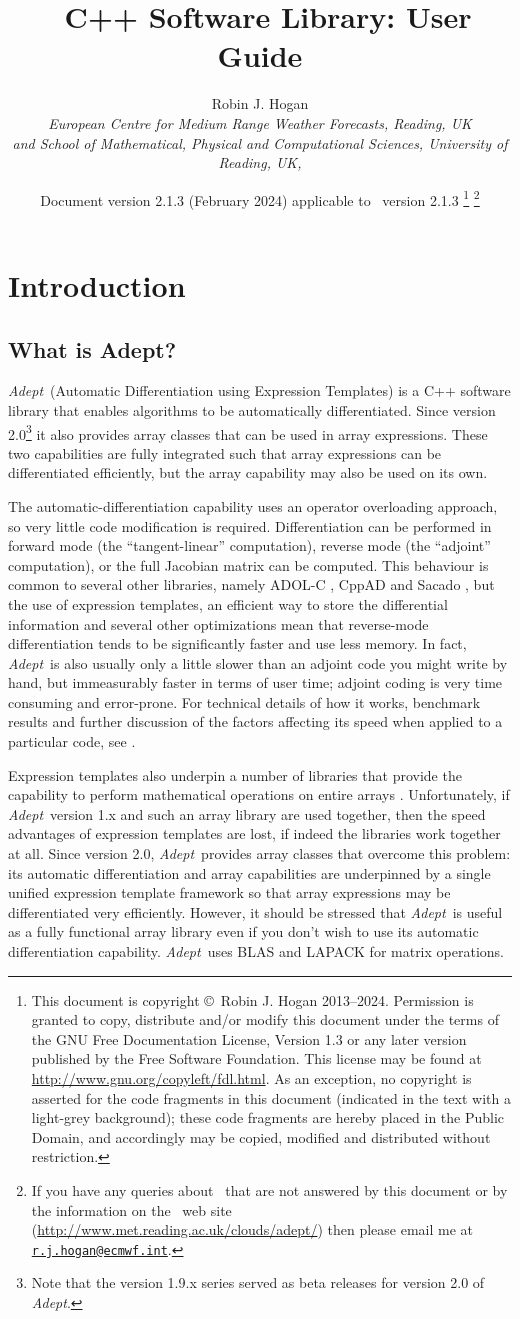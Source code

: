 \documentclass[a4,oneside]{book}
\title{\Adept\ C++ Software Library: User Guide}
\author{Robin J. Hogan\\ \emph{European Centre for Medium Range
    Weather Forecasts, Reading, UK}\\ \emph{and School of
    Mathematical, Physical and Computational Sciences, University of
    Reading, UK,}}
\date{Document version 2.1.3 (February 2024) applicable to \Adept\ version
  2.1.3 \thanks{This document is copyright \copyright\ Robin J. Hogan
    2013--2024.  Permission is granted to copy, distribute and/or
    modify this document under the terms of the GNU Free Documentation
    License, Version 1.3 or any later version published by the Free
    Software Foundation. This license may be found at
    \url{http://www.gnu.org/copyleft/fdl.html}.  As an exception, no
    copyright is asserted for the code fragments in this document
    (indicated in the text with a light-grey background); these code
    fragments are hereby placed in the Public Domain, and accordingly
    may be copied, modified and distributed without restriction.}
  \thanks{If you have any queries about \Adept\ that are not answered
    by this document or by the information on the \Adept\ web site
    (\url{http://www.met.reading.ac.uk/clouds/adept/}) then please
    email me at
    \href{mailto:r.j.hogan@ecmwf.int}{\texttt{r.j.hogan@ecmwf.int}}.}}
\def\Adept{\emph{Adept}}
\renewcommand\thefootnote{\relax}
\begin{document}
\maketitle

\tableofcontents
\def\thefootnote{\fnsymbol{footnote}}
\chapter{Introduction}
\section{What is Adept?}
\Adept\ (Automatic Differentiation using Expression Templates) is a
C++ software library that enables algorithms to be automatically
differentiated. Since version 2.0\footnote{Note that the version 1.9.x
  series served as beta releases for version 2.0 of \Adept.} it also
provides array classes that can be used in array expressions.  These
two capabilities are fully integrated such that array expressions can
be differentiated efficiently, but the array capability may also be
used on its own.

The automatic-differentiation capability uses an operator overloading
approach, so very little code modification is
required. Differentiation can be performed in forward mode (the
``tangent-linear'' computation), reverse mode (the ``adjoint''
computation), or the full Jacobian matrix can be computed. This
behaviour is common to several other libraries, namely ADOL-C
\citep{Griewank+1996}, CppAD \citep{Bell2007} and Sacado
\citep{Gay2005}, but the use of expression templates, an efficient way
to store the differential information and several other optimizations
mean that reverse-mode differentiation tends to be significantly
faster and use less memory. In fact, \Adept\ is also usually only a
little slower than an adjoint code you might write by hand, but
immeasurably faster in terms of user time; adjoint coding is very time
consuming and error-prone. For technical details of how it works,
benchmark results and further discussion of the factors affecting its
speed when applied to a particular code, see \cite{Hogan2014}.

Expression templates also underpin a number of libraries that provide
the capability to perform mathematical operations on entire arrays
\citep{Veldhuizen1995}. Unfortunately, if \Adept\ version 1.x and such
an array library are used together, then the speed advantages of
expression templates are lost, if indeed the libraries work together
at all. Since version 2.0, \Adept\ provides array classes that
overcome this problem: its automatic differentiation and array
capabilities are underpinned by a single unified expression template
framework so that array expressions may be differentiated very
efficiently.  However, it should be stressed that \Adept\ is useful as
a fully functional array library even if you don't wish to use its
automatic differentiation capability. \Adept\ uses BLAS and LAPACK for
matrix operations.
\end{document}
